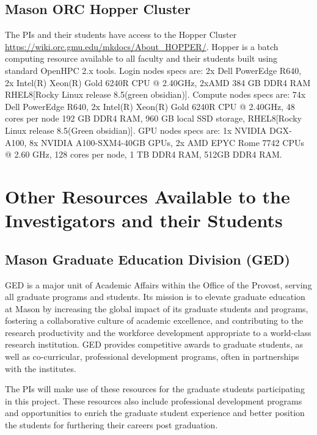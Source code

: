 \documentclass[11pt]{article}
\begin{document}
\subsection*{Mason ORC Hopper Cluster} The PIs and their students have access to the Hopper Cluster \url{https://wiki.orc.gmu.edu/mkdocs/About_HOPPER/}. Hopper is a batch computing resource available to all faculty and their students built using standard OpenHPC 2.x tools. Login nodes specs are: 2x Dell PowerEdge R640, 2x Intel(R) Xeon(R) Gold 6240R CPU @ 2.40GHz, 2xAMD 384 GB DDR4 RAM RHEL8[Rocky Linux release 8.5(green obsidian)]. Compute nodes specs are: 74x Dell PowerEdge R640,
2x Intel(R) Xeon(R) Gold 6240R CPU @ 2.40GHz, 48 cores per node
192 GB DDR4 RAM, 960 GB local SSD storage, RHEL8[Rocky Linux release 8.5(Green obsidian)]. GPU nodes specs are: 1x NVIDIA DGX-A100, 8x NVIDIA A100-SXM4-40GB GPUs, 2x AMD EPYC Rome 7742 CPUs @ 2.60 GHz, 128 cores per node, 1 TB DDR4 RAM, 512GB DDR4 RAM.

\section*{Other Resources Available to the Investigators and their Students}

\subsection*{Mason Graduate Education Division (GED)} GED is a major unit of Academic Affairs within the Office of the Provost, serving all graduate programs and students. Its mission is to elevate graduate education at Mason by increasing the global impact of its graduate students and programs, fostering a collaborative culture of academic excellence, and contributing to the research productivity and the workforce development appropriate to a world-class research institution. GED provides competitive awards to graduate students, as well as co-curricular, professional development programs, often in partnerships with the institutes.

The PIs will make use of these resources for the graduate students participating in this project. These resources also include professional development programs and opportunities to enrich the graduate student experience and better position the students for furthering their careers post graduation.
\end{document}

